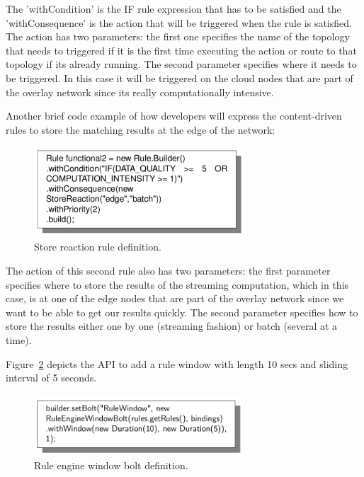 The 'withCondition' is the IF rule expression that has to be satisfied and the 'withConsequence' is the action that will be triggered when the rule is satisfied. The action has two parameters: the first one specifies the name of the topology that needs to triggered if it is the first time executing the action or route to that topology if its already running. The second parameter specifies where it needs to be triggered. In this case it will be triggered on the cloud nodes that are part of the overlay network since its really computationally intensive. 

Another brief code example of how developers will express the content-driven rules to store the matching results at the edge of the network:

\begin{figure}[h!]
  \centering
  \includegraphics[width=0.7\textwidth]{Figures/StoreReaction.pdf}
  \caption{Store reaction rule definition.}
  \label{fig:StoreReaction}
\end{figure}


The action of this second rule also has two parameters: the first parameter specifies where to store the results of the streaming computation, which in this case, is at one of the edge nodes that are part of the overlay network since we want to be able to get our results quickly. The second parameter specifies how to store the results either one by one (streaming fashion) or batch (several at a time).


Figure~\ref{fig:WindowBolt} depicts the API to add a rule window with length 10 secs and sliding interval of 5 seconds.

\begin{figure}[h!]
  \centering
  \includegraphics[width=0.7\textwidth]{Figures/WindowBolt.png}
  \caption{Rule engine window bolt definition.}
  \label{fig:WindowBolt}
\end{figure}


